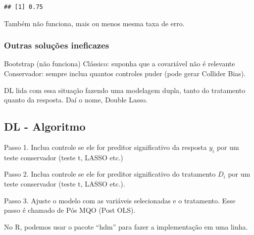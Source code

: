\documentclass[
]{article}
\begin{document}
\begin{verbatim}
## [1] 0.75
\end{verbatim}

Também não funciona, mais ou menos mesma taxa de erro.

\subsubsection{Outras soluções ineficazes}\label{outras-soluuxe7uxf5es-ineficazes}

Bootstrap (não funciona)
Clássico: suponha que a covariável não é relevante
Conservador: sempre inclua quantos controles puder (pode gerar Collider Bias).

DL lida com essa situação fazendo uma modelagem dupla, tanto do tratamento quanto da resposta. Daí o nome, Double Lasso.

\subsection{DL - Algoritmo}\label{dl---algoritmo}

Passo 1. Inclua controle se ele for preditor significativo da resposta \(y_i\) por um teste conservador (teste t, LASSO etc.)

Passo 2. Inclua controle se ele for preditor significativo do tratamento \(D_i\) por um teste conservador (teste t, LASSO etc.).

Passo 3. Ajuste o modelo com as variáveis selecionadas e o tratamento. Esse passo é chamado de Pós MQO (Post OLS).

No R, podemos usar o pacote ``hdm'' para fazer a implementação em uma linha.
\end{document}
